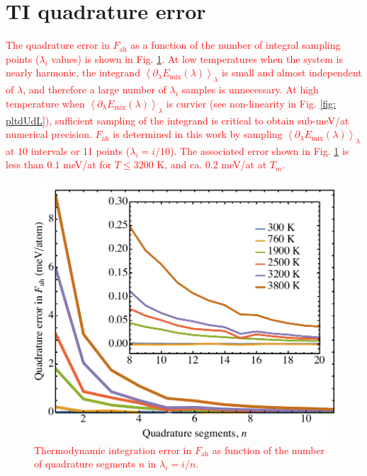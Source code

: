 \documentclass[twocolumn,american,aps,prb,showpacs,showkeys,amsmath,amssymb,superscriptaddress,a4]{revtex4-1}
\begin{document}
\hfill

\section*{TI quadrature error\label{sec: errorTI}}
 \textcolor{red}{The quadrature error in $F_\text{ah}$ as a function of the number of integral sampling points ($\lambda_i$ values) is shown in Fig. \ref{fig: pltErrorTI}. At low temperatures when the system is nearly harmonic, the integrand $\left\langle \partial_{\lambda}E_{\text{mix}}(\lambda)\right\rangle _{\lambda}$ is small and almost independent of $\lambda$, and therefore a large number of $\lambda_i$ samples is unnecessary. At high temperature when $\left\langle \partial_{\lambda}E_{\text{mix}}(\lambda)\right\rangle _{\lambda}$ is curvier (see non-linearity in Fig. \ref{fig: pltdUdL}), sufficient sampling of the integrand is critical to obtain sub-meV/at numerical precision. $F_\text{ah}$ is determined in this work by sampling $\left\langle \partial_{\lambda}E_{\text{mix}}(\lambda)\right\rangle _{\lambda}$ at $10$ intervals or 11 points ($\lambda_i=i/10$). The associated error shown in Fig. \ref{fig: pltErrorTI} is less than $0.1$ meV/at for $T\le3200$ K, and ca. $0.2$ meV/at at $T_m$.}

\begin{figure}[h]
\begin{centering}
\includegraphics[scale=0.55]{Fig10_pltTIerror}
\par\end{centering}
\caption{\foreignlanguage{american}{ \textcolor{red}{Thermodynamic integration error in $F_\text{ah}$ as function of the number of quadrature segments $n$ in $\lambda_i=i/n$.}\label{fig: pltErrorTI}}}
\end{figure}
\end{document}
